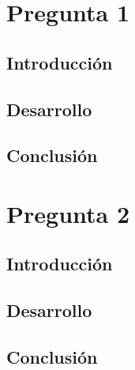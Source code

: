\documentclass[letterpaper,11pt]{article}  %
\newcommand{\tipofuentetitulo}{\huge}             %
\newcommand{\tipofuentesubtitulo}{\Large}         %
\newcommand{\tipofuentesubsubtitulo}{\large}      %
\newcommand{\etipofuentetitulo}{\bfseries}        %
\newcommand{\etipofuentesubtitulo}{\bfseries}     %
\newcommand{\etipofuentesubsubtitulo}{\bfseries}  %
\begin{document}
\newpage
\sectionfont{\tipofuentetitulo \etipofuentetitulo \selectfont}
\subsectionfont{\tipofuentesubtitulo \etipofuentesubtitulo \selectfont}
\subsubsectionfont{\tipofuentesubsubtitulo \etipofuentesubsubtitulo \selectfont}
\setcounter{page}{1}
\renewcommand{\thepage}{\arabic{page}}


\section{Pregunta 1}

	\subsection{Introducción}
	
		\lipsum[2]
		
	\subsection{Desarrollo}
	
		\lipsum[1]
		
	\subsection{Conclusión}
	
		\lipsum[3]
		
		
\section{Pregunta 2}

	\subsection{Introducción}
	
		\lipsum[5]
		
	\subsection{Desarrollo}
	
		\lipsum[7]
		
	\subsection{Conclusión}
	
		\lipsum[8]

\end{document}
